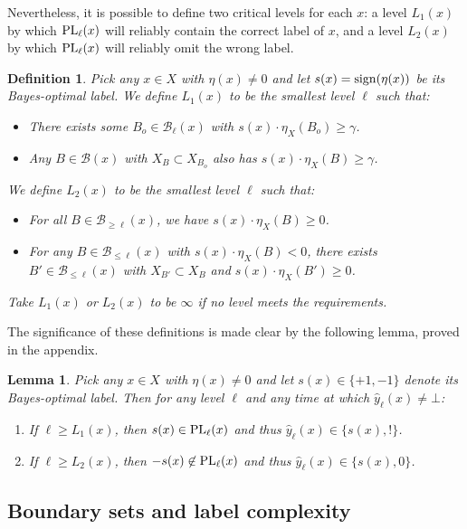 \documentclass{article}
\def\B{{\mathcal B}}
\def\yh{{\widehat{y}}}
\def\sign{{\rm sign}}
\def\PL{{\mbox{\rm PL}}}
\newtheorem{lemma}[thm]{Lemma}
\newtheorem{defn}[thm]{Definition}
\begin{document}
Nevertheless, it is possible to define two critical levels for each $x$: a level $L_1(x)$ by which $\PL_\ell(x)$ will reliably contain the correct label of $x$, and a level $L_2(x)$ by which $\PL_\ell(x)$ will reliably omit the wrong label.

\begin{defn}
Pick any $x \in X$ with $\eta(x) \neq 0$ and let $s(x) = \sign(\eta(x))$ be its Bayes-optimal label. We define $L_1(x)$ to be the smallest level $\ell$ such that:
\begin{itemize}
\item There exists some $B_o \in \B_\ell(x)$ with $s(x) \cdot \eta_X(B_o) \geq \gamma$.
\item Any $B \in \B(x)$ with $X_{B} \subset X_{B_o}$ also has $s(x) \cdot \eta_X(B) \geq \gamma$.
\end{itemize}
We define $L_2(x)$ to be the smallest level $\ell$ such that:
\begin{itemize}
\item For all $B \in \B_{\geq \ell}(x)$, we have $s(x) \cdot \eta_X(B) \geq 0$.
\item For any $B \in \B_{\leq \ell}(x)$ with $s(x) \cdot \eta_X(B) < 0$, there exists $B' \in \B_{\leq \ell}(x)$ with $X_{B'} \subset X_B$ and $s(x) \cdot \eta_X(B') \geq 0$.
\end{itemize}
Take $L_1(x)$ or $L_2(x)$ to be $\infty$ if no level meets the requirements. 
\label{defn:L12}
\end{defn}

The significance of these definitions is made clear by the following lemma, proved in the appendix.

\begin{lemma}
Pick any $x \in X$ with $\eta(x) \neq 0$ and let $s(x) \in \{+1,-1\}$ denote its Bayes-optimal label. Then for any level $\ell$ and any time at which $\yh_\ell(x) \neq \bot$:
\begin{enumerate}
\item[(a)] If $\ell \geq L_1(x)$, then $s(x) \in \PL_\ell(x)$ and thus $\yh_\ell(x) \in \{s(x), !\}$. 
\item[(b)] If $\ell \geq L_2(x)$, then $-s(x) \not\in \PL_\ell(x)$ and thus $\yh_\ell(x) \in \{s(x), 0\}$.
\end{enumerate}
\label{lemma:boundary}
\end{lemma}

\subsection{Boundary sets and label complexity}
\end{document}
